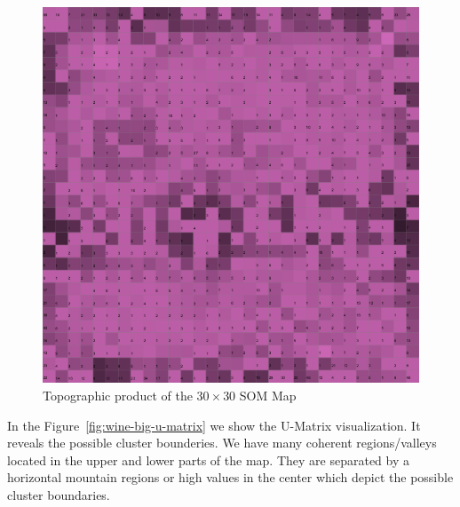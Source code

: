 \documentclass{acm_proc_article-sp}
\begin{document}
\begin{figure}
\centering
\includegraphics[width=\linewidth]{img/wine-big-topo-product}
\caption{Topographic product of the $30\times30$ SOM Map}
\label{fig:wine-big-topo-product}
\end{figure}

In the Figure~\ref{fig:wine-big-u-matrix} we show the U-Matrix visualization.
It reveals the possible cluster bounderies. We have many coherent regions/valleys located in
the upper and lower parts of the map. They are separated by a horizontal mountain regions
or high values in the center which depict the possible cluster boundaries.
\end{document}
